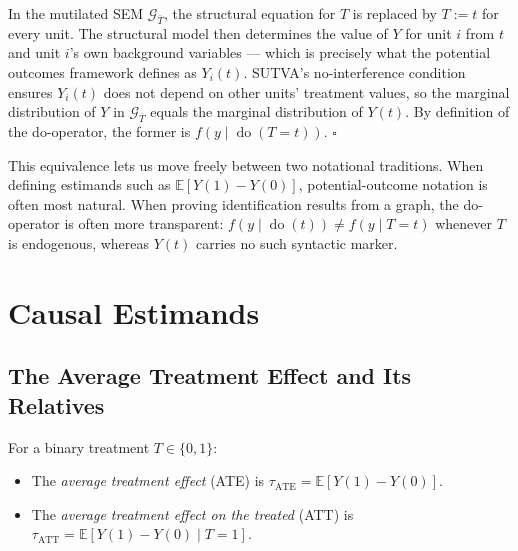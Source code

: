 \documentclass[
  a4paper,
]{book}
\providecommand{\tightlist}{%
  \setlength{\itemsep}{0pt}\setlength{\parskip}{0pt}}
\newcommand{\doop}{\operatorname{do}}
\newcommand{\E}{\mathbb{E}}
\newcommand{\Gcal}{\mathcal{G}}
\begin{document}
\begin{tcolorbox}[enhanced jigsaw, arc=.35mm, bottomrule=.15mm, bottomtitle=1mm, breakable, colback=white, colbacktitle=quarto-callout-note-color!10!white, colframe=quarto-callout-note-color-frame, coltitle=black, left=2mm, leftrule=.75mm, opacityback=0, opacitybacktitle=0.6, rightrule=.15mm, title={Proof}, titlerule=0mm, toprule=.15mm, toptitle=1mm]

In the mutilated SEM \(\Gcal_{\overline{T}}\), the structural equation
for \(T\) is replaced by \(T := t\) for every unit. The structural model
then determines the value of \(Y\) for unit \(i\) from \(t\) and unit
\(i\)'s own background variables --- which is precisely what the
potential outcomes framework defines as \(Y_i(t)\). SUTVA's
no-interference condition ensures \(Y_i(t)\) does not depend on other
units' treatment values, so the marginal distribution of \(Y\) in
\(\Gcal_{\overline{T}}\) equals the marginal distribution of \(Y(t)\).
By definition of the do-operator, the former is
\(f(y \mid \doop(T{=}t))\). \(\square\)

\end{tcolorbox}

This equivalence lets us move freely between two notational traditions.
When defining estimands such as \(\E[Y(1) - Y(0)]\), potential-outcome
notation is often most natural. When proving identification results from
a graph, the do-operator is often more transparent:
\(f(y \mid \doop(t)) \neq f(y \mid T{=}t)\) whenever \(T\) is
endogenous, whereas \(Y(t)\) carries no such syntactic marker.

\section{Causal Estimands}\label{sec-estimands}

\subsection{The Average Treatment Effect and Its
Relatives}\label{the-average-treatment-effect-and-its-relatives}

\begin{tcolorbox}[enhanced jigsaw, arc=.35mm, bottomrule=.15mm, bottomtitle=1mm, breakable, colback=white, colbacktitle=quarto-callout-note-color!10!white, colframe=quarto-callout-note-color-frame, coltitle=black, left=2mm, leftrule=.75mm, opacityback=0, opacitybacktitle=0.6, rightrule=.15mm, title={Definition: ATE and ATT}, titlerule=0mm, toprule=.15mm, toptitle=1mm]

For a binary treatment \(T \in \{0,1\}\):

\begin{itemize}
\tightlist
\item
  The \emph{average treatment effect} (ATE) is
  \(\tau_{\mathrm{ATE}} = \E[Y(1) - Y(0)]\).
\item
  The \emph{average treatment effect on the treated} (ATT) is
  \(\tau_{\mathrm{ATT}} = \E[Y(1) - Y(0) \mid T{=}1]\).
\end{itemize}

\end{tcolorbox}
\end{document}
